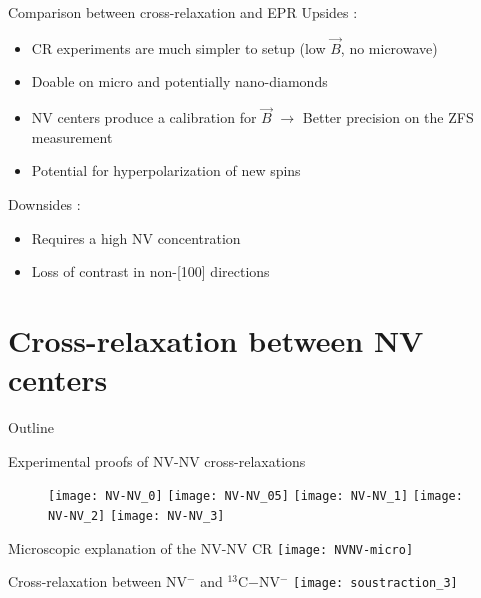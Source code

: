 \documentclass{beamer}
\begin{document}
\begin{frame}{Comparison between cross-relaxation and EPR}
\pause
Upsides :
\begin{itemize}
\item CR experiments are much simpler to setup (low $\vec B$, no microwave)
\pause
\item Doable on micro and potentially nano-diamonds
\pause
\item NV centers produce a calibration for $\vec B$ $\to$ Better precision on the ZFS measurement
\pause
\item Potential for hyperpolarization of new spins
\pause
\end{itemize}
Downsides :
\begin{itemize}
\item Requires a high NV concentration
\pause
\item Loss of contrast in non-[100] directions
\end{itemize}
\end{frame}
\section{Cross-relaxation between NV centers}
\begin{frame}{Outline}
\tableofcontents[currentsection]
\end{frame}
\begin{frame}{Experimental proofs of NV-NV cross-relaxations}
\begin{figure}
    \begin{overprint}
    \texttt{[image: NV-NV\_0]}
    \texttt{[image: NV-NV\_05]}
    \texttt{[image: NV-NV\_1]}
    \texttt{[image: NV-NV\_2]}
    \texttt{[image: NV-NV\_3]}
    \end{overprint}
\end{figure}
\end{frame}
\begin{frame}{Microscopic explanation of the NV-NV CR}
\centering
\texttt{[image: NVNV-micro]}
\end{frame}
\begin{frame}{Cross-relaxation between NV$^-$ and $^{13}$C$-$NV$^-$}
\texttt{[image: soustraction\_3]}
\end{frame}
\end{document}
